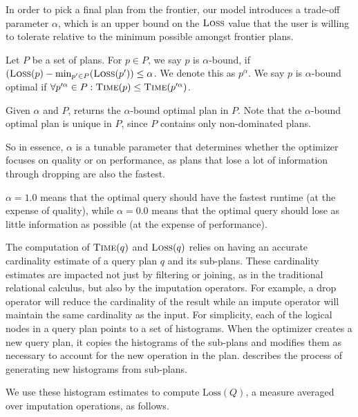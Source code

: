 In order to pick a final plan from the frontier, our model introduces a trade-off parameter $\alpha$, which is an upper bound on the $\textsc{Loss}$ value that the user is willing
to tolerate relative to the minimum possible amongst frontier plans.

\begin{definition}
Let $P$ be a set of plans. For $p \in P$, we say $p$ is $\alpha$-bound, if $(\textsc{Loss}(p) - \min_{p' \in P}(\textsc{Loss}(p')) \leq \alpha$. We denote this as $p^\alpha$.
We say $p$ is $\alpha$-bound optimal if $\forall p'^\alpha \in P: \textsc{Time}(p) \leq \textsc{Time}(p'^\alpha)$. 
\end{definition}

Given $\alpha$ and $P$, \ProjectName{} returns the $\alpha$-bound optimal plan in $P$. Note that the $\alpha$-bound optimal plan is unique in $P$, since $P$ contains only non-dominated plans.

So in essence, $\alpha$ is a tunable parameter that determines whether the optimizer focuses on quality or on performance, as plans that
lose a lot of information through dropping are also the fastest. 

$\alpha = 1.0$ means that the optimal query should have the fastest runtime (at the expense of quality), while $\alpha=0.0$ means that the optimal query should lose
as little information as possible (at the expense of performance).

The computation of $\textsc{Time}(q)$ and $\textsc{Loss}(q)$ relies on having an accurate cardinality estimate of a query plan $q$ and its sub-plans. 
These cardinality estimates are impacted not just by filtering or joining, as in the traditional relational calculus, but also by the imputation operators.
For example, a drop operator will reduce the cardinality of the result while an impute operator will maintain the same cardinality as the input.
For simplicity, each of the logical nodes in a query plan points to a set of histograms.
When the optimizer creates a new query plan, it copies the histograms of the sub-plans and modifies them as necessary to account for the new operation in the plan.
 describes the process of generating new histograms from sub-plans.

We use these histogram estimates to compute $\text{Loss}(Q)$, a measure averaged over imputation operations, as follows.

